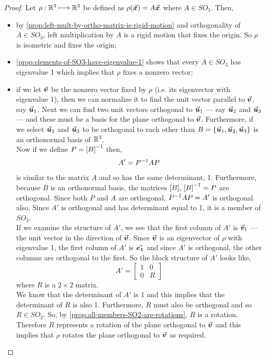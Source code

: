 \documentclass[MathsNotesBase.tex]{subfiles}
\begin{document}
{	\bigskip
	\begin{proof}
		Let ${ \rho: \mathbb{R}^{3} \longmapsto \mathbb{R}^{3} }$ be defined as ${ \rho(\vec{\bm{x}}) = A\vec{\bm{x}} }$ where ${ A \in SO_3 }$. Then,
		\begin{itemize}
			\item{by \autoref{prop:left-mult-by-ortho-matrix-is-rigid-motion} and orthogonality of ${ A \in SO_3 }$, left multiplication by $A$ is a rigid motion that fixes the origin. So $\rho$ is isometric and fixes the origin;}
			\item{\autoref{prop:elements-of-SO3-have-eigenvalue-1} shows that every ${ A \in SO_3 }$ has eigenvalue 1 which implies that $\rho$ fixes a nonzero vector;}
			\item{if we let $\vec{\bm{v}}$ be the nonzero vector fixed by $\rho$ (i.e. its eigenvector with eigenvalue 1), then we can normalize it to find the unit vector parallel to $\vec{\bm{v}}$, say $\vec{\bm{u}}_1$. Next we can find two unit vectors orthogonal to $\vec{\bm{u}}_1$ --- say $\vec{\bm{u}}_2$ and $\vec{\bm{u}}_3$ --- and these must be a basis for the plane orthogonal to $\vec{\bm{v}}$. Furthermore, if we select $\vec{\bm{u}}_2$ and $\vec{\bm{u}}_3$ to be orthogonal to each other than ${ B = \{\vec{\bm{u}}_1,\vec{\bm{u}}_2,\vec{\bm{u}}_3\} }$ is an orthonormal basis of $\mathbb{R}^{3}$.\\
				Now if we define ${ P = {[B]}^{-1} }$ then,
				\[ A' = {P}^{-1}AP \]
				is similar to the matrix $A$ and so has the same determinant, 1. Furthermore, because $B$ is an orthonormal basis, the matrices ${ [B],\, {[B]}^{-1} = P }$ are orthogonal. Since both $P$ and $A$ are orthogonal, ${ {P}^{-1}AP = A' }$ is orthogonal also. Since $A'$ is orthogonal and has determinant equal to 1, it is a member of $SO_3$.\\
				If we examine the structure of $A'$, we see that the first column of $A'$ is $\vec{\bm{v}}_1$ --- the unit vector in the direction of $\vec{\bm{v}}$. Since $\vec{\bm{v}}$ is an eigenvector of $\rho$ with eigenvalue 1, the first column of $A'$ is $\vec{\bm{e_1}}$ and since $A'$ is orthogonal, the other columns are orthogonal to the first. So the block structure of $A'$ looks like,
				\[ A' = \begin{bmatrix}
						1 & 0 \\
						0 & R
						\end{bmatrix} 
				\]
				where $R$ is a ${ 2 \times 2 }$ matrix.\\
				We know that the determinant of $A'$ is 1 and this implies that the determinant of $R$ is also 1. Furthermore, $R$ must also be orthogonal and so ${ R \in SO_2 }$. So, by \autoref{prop:all-members-SO2-are-rotations}, $R$ is a rotation. Therefore $R$ represents a rotation of the plane orthogonal to $\vec{\bm{v}}$ and this implies that $\rho$ rotates the plane orthogonal to $\vec{\bm{v}}$ as required.
			}
		\end{itemize}
	\end{proof}
	
}
\end{document}
